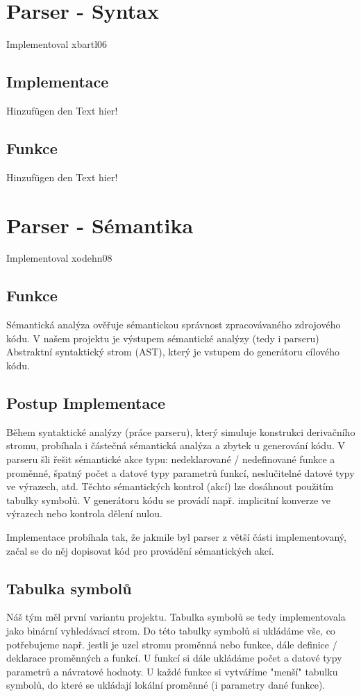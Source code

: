 \documentclass[11pt,a4paper]{article}
\begin{document}
\section{Parser - Syntax}
    Implementoval xbartl06

    \subsection{Implementace}
    \noindent Hinzufügen den Text hier!

    \subsection{Funkce}
    \noindent Hinzufügen den Text hier!
    \newpage



\section{Parser - Sémantika}
    Implementoval xodehn08
    
    \subsection{Funkce}
    Sémantická analýza ověřuje sémantickou správnost zpracovávaného zdrojového kódu. V našem projektu je výstupem sémantické analýzy (tedy i parseru) Abstraktní syntaktický strom (AST), který je vstupem do generátoru cílového kódu. 

    \subsection{Postup Implementace}
    Během syntaktické analýzy (práce parseru), který simuluje konstrukci derivačního stromu, probíhala i částečná sémantická analýza a zbytek u generování kódu. V parseru šli řešit sémantické akce typu: nedeklarované / nedefinované funkce a proměnné, špatný počet a datové typy parametrů funkcí, neslučitelné datové typy ve výrazech, atd. Těchto sémantických kontrol (akcí) lze dosáhnout použitím tabulky symbolů. V generátoru kódu se provádí např. implicitní konverze ve výrazech nebo kontrola dělení nulou.
    
    Implementace probíhala tak, že jakmile byl parser z větší části implementovaný, začal se do něj dopisovat kód pro provádění sémantických akcí.
    
    \subsection{Tabulka symbolů}
    Náš tým měl první variantu projektu. Tabulka symbolů se tedy implementovala jako binární vyhledávací strom. Do této tabulky symbolů si ukládáme vše, co potřebujeme např. jestli je uzel stromu proměnná nebo funkce, dále definice / deklarace proměnných a funkcí. U funkcí si dále ukládáme počet a datové typy parametrů a návratové hodnoty. U každé funkce si vytváříme "menší" tabulku symbolů, do které se ukládají lokální proměnné (i parametry dané funkce).
    
\end{document}
